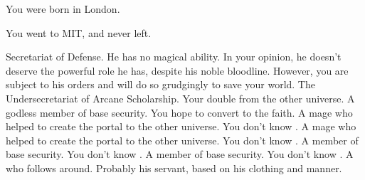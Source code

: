 \documentclass[char]{guildcamp3}
\begin{document}
\begin{itemz}[Notes]
  \item You were born in London.
  \item You went to MIT, and never left.
\end{itemz}


\begin{contacts}
  \contact{\cNobleOne{}} Secretariat of Defense. He has no magical ability. In your opinion, he doesn't deserve the powerful role he has, despite his noble bloodline. However, you are subject to his orders and will do so grudgingly to save your world.
  \contact{\cNobleTwo{}} The Undersecretariat of Arcane Scholarship. 
  \contact{\cSpecOpTwo{}} Your double from the other universe. A godless member of base security. You hope to convert \cSpecOpTwo{\them} to the faith.
  \contact{\cMageOne{}} A mage who helped to create the portal to the other universe. You don't know \cMageOne{\them}.
  \contact{\cMageTwo{}} A mage who helped to create the portal to the other universe. You don't know \cMageTwo{\them}.
  \contact{\cRogueOne{}} A member of base security. You don't know \cRogueOne{\them}.
  \contact{\cRogueTwo{}} A member of base security. You don't know \cRogueOne{\them}.
  \contact{\cServant{}} A \cServant{\gender} who follows \cNobleOne{} around. Probably his servant, based on his clothing and manner.
\end{contacts}
\end{document}
